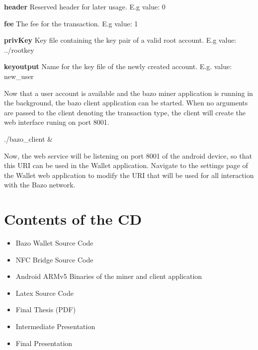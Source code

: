 \textbf{header}  Reserved header for later usage. E.g value: 0

\textbf{fee}  The fee for the transaction. E.g value: 1

\textbf{privKey} Key file containing the key pair of a valid root account. E.g value: ../rootkey

\textbf{keyoutput} Name for the key file of the newly created account. E.g. value: new\_user

Now that a user account is available and the bazo miner application is running in the background, the bazo client application can be started. When no arguments are passed to the client denoting the transaction type, the client will create the web interface runing on port 8001.
\begin{framed}
./bazo\_client \&
\end{framed}
Now, the web service will be listening on port 8001 of the android device, so that this URI can be used in the Wallet application. Navigate to the settings page of the Wallet web application to modify the URI that will be used for all  interaction with the Bazo network.

\chapter{Contents of the CD}
\begin{itemize}
\item Bazo Wallet Source Code
\item NFC Bridge Source Code
\item Android ARMv5 Binaries of the miner and client application
\item Latex Source Code
\item Final Thesis (PDF)
\item Intermediate Presentation
\item Final Presentation

\end{itemize}